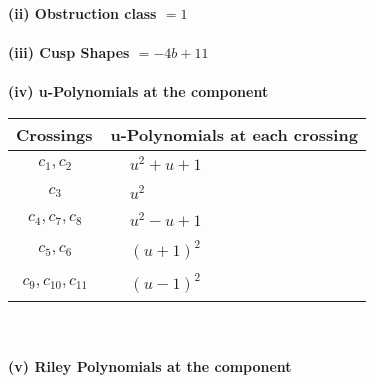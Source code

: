 \documentclass[1p]{elsarticle_modified}
\theoremstyle{definition}
\begin{document}
\flushleft \textbf{(ii) Obstruction class $= 1$}\\~\\
\flushleft \textbf{(iii) Cusp Shapes $= -4 b+11$}\\~\\
\newpage\renewcommand{\arraystretch}{1}
\flushleft \textbf{(iv) u-Polynomials at the component}\newline \\
\begin{tabular}{m{50pt}|m{274pt}}
Crossings & \hspace{64pt}u-Polynomials at each crossing \\
\hline $$\begin{aligned}c_{1},c_{2}\end{aligned}$$&$\begin{aligned}
&u^2+u+1
\end{aligned}$\\
\hline $$\begin{aligned}c_{3}\end{aligned}$$&$\begin{aligned}
&u^2
\end{aligned}$\\
\hline $$\begin{aligned}c_{4},c_{7},c_{8}\end{aligned}$$&$\begin{aligned}
&u^2- u+1
\end{aligned}$\\
\hline $$\begin{aligned}c_{5},c_{6}\end{aligned}$$&$\begin{aligned}
&(u+1)^2
\end{aligned}$\\
\hline $$\begin{aligned}c_{9},c_{10},c_{11}\end{aligned}$$&$\begin{aligned}
&(u-1)^2
\end{aligned}$\\
\hline
\end{tabular}\\~\\
\newpage\renewcommand{\arraystretch}{1}
\flushleft \textbf{(v) Riley Polynomials at the component}\newline \\
\end{document}
